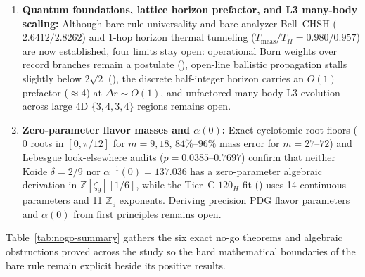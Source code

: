\begin{enumerate}[itemsep=3pt]
$0.29808\text{ beat}^{-1} = 0.088\, M_{\mathrm{Pl}}$ for the Grover tree), sitting $\sim 61$ decades above $H_0$
($122$ decades in $\Lambda \propto H^2$). Neither CKN scaling nor the $D = 95$-anchored toy Bousso--Polchinski scan
() resolves Weinberg's (1989) no-go \cite{weinberg1989}.
\item \textbf{Quantum foundations, lattice horizon prefactor, and L3 many-body scaling:} Although bare-rule
universality and bare-analyzer Bell--CHSH ($2.6412 / 2.8262$) and 1-hop horizon thermal tunneling
($T_{\mathrm{meas}}/T_H = 0.980 / 0.957$) are now established, four limits stay open: operational Born weights over
record branches remain a postulate (), open-line ballistic propagation stalls slightly below
$2\sqrt{2}$ (), the discrete half-integer horizon carries an $O(1)$ prefactor ($\approx 4$) at
$\Delta r \sim O(1)$, and unfactored many-body L3 evolution across large 4D $\{3,4,3,4\}$ regions remains open.
\item \textbf{Zero-parameter flavor masses and $\alpha(0)$:} Exact cyclotomic root floors ($0$ roots in $[0, \pi/12]$
for $m = 9, 18$, $84\%\text{--}96\%$ mass error for $m = 27\text{--}72$) and Lebesgue look-elsewhere audits
($p = 0.0385\text{--}0.7697$) confirm that neither Koide $\delta = 2/9$ nor $\alpha^{-1}(0) = 137.036$ has a
zero-parameter algebraic derivation in $\mathbb{Z}[\zeta_9][1/6]$, while the Tier~C $120_H$ fit ()
uses 14 continuous parameters and 11 $\mathbb{Z}_9$ exponents. Deriving precision PDG flavor parameters and
$\alpha(0)$ from first principles remains open.
\end{enumerate}

Table~\ref{tab:nogo-summary} gathers the six exact no-go theorems and algebraic obstructions proved across the study so
the hard mathematical boundaries of the bare rule remain explicit beside its positive results.

